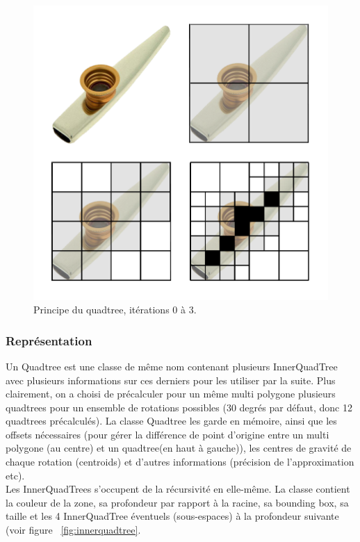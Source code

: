 \begin{figure}[H]
\centering
\includegraphics[scale=0.5]{img/quadtreeprinciple.png}
\caption{Principe du quadtree, itérations 0 à 3.}
    \label{fig:quadtreeprinciple}
\end{figure}

\subsubsection{Représentation}

Un Quadtree est une classe de même nom contenant plusieurs InnerQuadTree avec plusieurs informations sur ces derniers pour les utiliser par la suite. Plus clairement, on a choisi de précalculer pour un même multi polygone plusieurs quadtrees pour un ensemble de rotations possibles (30 degrés par défaut, donc 12 quadtrees précalculés). La classe Quadtree les garde en mémoire, ainsi que les offsets nécessaires (pour gérer la différence de point d'origine entre un multi polygone (au centre) et un quadtree(en haut à gauche)), les centres de gravité de chaque rotation (centroids) et d'autres informations (précision de l'approximation etc).\\


Les InnerQuadTrees s'occupent de la récursivité en elle-même. La classe contient la couleur de la zone, sa profondeur par rapport à la racine, sa bounding box, sa taille et les 4 InnerQuadTree éventuels (sous-espaces) à la profondeur suivante (voir figure ~\ref{fig:innerquadtree}.

